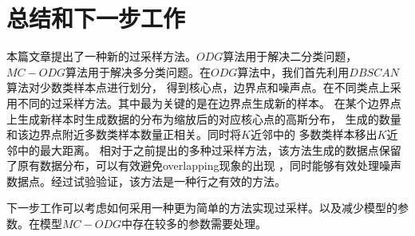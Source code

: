 \documentclass{article}
\begin{document}
\section{总结和下一步工作}
本篇文章提出了一种新的过采样方法。$ODG$算法用于解决二分类问题，
$MC-ODG$算法用于解决多分类问题。在$ODG$算法中，我们首先利用$DBSCAN$算法对少数类样本点进行划分，
得到核心点，边界点和噪声点。在不同类点上采用不同的过采样方法。其中最为关键的是在边界点生成新的样本。
在某个边界点上生成新样本时生成数据的分布为缩放后的对应核心点的高斯分布，
生成的数量和该边界点附近多数类样本数量正相关。同时将$K$近邻中的
多数类样本移出$K$近邻中的最大距离。
相对于之前提出的多种过采样方法，该方法生成的数据点保留了原有数据分布，可以有效避免overlapping现象的出现
，同时能够有效处理噪声数据点。经过试验验证，该方法是一种行之有效的方法。

下一步工作可以考虑如何采用一种更为简单的方法实现过采样。以及减少模型的参数。在模型$MC-ODG$中存在较多的参数需要处理。


\end{document}
